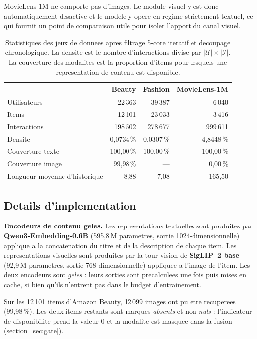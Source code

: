 MovieLens-1M ne comporte pas d'images. Le module visuel y est donc
automatiquement desactive et le modele y opere en regime strictement
textuel, ce qui fournit un point de comparaison utile pour isoler l'apport
du canal visuel.

\begin{table}[t]
\centering
\caption{Statistiques des jeux de donnees apres filtrage 5-core iteratif et
decoupage chronologique. La densite est le nombre d'interactions divise par
$|\mathcal{U}|\times|\mathcal{I}|$. La couverture des modalites est la
proportion d'items pour lesquels une representation de contenu est disponible.}
\label{tab:datasets}
\small
\begin{tabular}{lrrr}
\toprule
& \textbf{Beauty} & \textbf{Fashion} & \textbf{MovieLens-1M} \\
\midrule
Utilisateurs            & 22\,363 & 39\,387 & 6\,040 \\
Items                   & 12\,101 & 23\,033 & 3\,416 \\
Interactions            & 198\,502 & 278\,677 & 999\,611 \\
Densite                 & 0,0734\,\% & 0,0307\,\% & 4,8448\,\% \\
Couverture texte        & 100,00\,\% & 100,00\,\% & 100,00\,\% \\
Couverture image        & 99,98\,\%  & ---          & 0,00\,\% \\
Longueur moyenne d'historique & 8,88 & 7,08 & 165,50 \\
\bottomrule
\end{tabular}
\end{table}

\subsection{Details d'implementation}
\label{sec:impl}

\textbf{Encodeurs de contenu geles.} Les representations textuelles sont
produites par \textbf{Qwen3-Embedding-0.6B} (595,8\,M parametres, sortie
1024-dimensionnelle) applique a la concatenation du titre et de la description
de chaque item. Les representations visuelles sont produites par la tour vision
de \textbf{SigLIP~2 base} (92,9\,M parametres, sortie 768-dimensionnelle)
appliquee a l'image de l'item. Les deux encodeurs sont \emph{geles} : leurs
sorties sont precalculees une fois puis mises en cache, si bien qu'ils
n'entrent pas dans le budget d'entrainement.

Sur les 12\,101 items d'Amazon Beauty, 12\,099 images ont pu etre recuperees
(99,98\,\%). Les deux items restants sont marques \emph{absents} et non
\emph{nuls} : l'indicateur de disponibilite prend la valeur 0 et la modalite
est masquee dans la fusion (section~\ref{sec:gate}).

